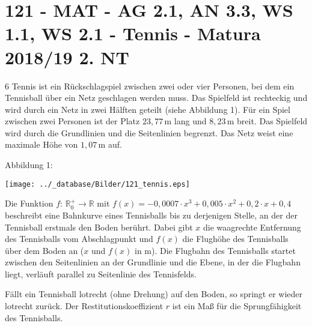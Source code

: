 \section{121 - MAT - AG 2.1, AN 3.3, WS 1.1, WS 2.1 - Tennis - Matura 2018/19 2. NT}

\begin{langesbeispiel} \item[6] %
Tennis ist ein Rückschlagspiel zwischen zwei oder vier Personen, bei dem ein Tennisball über
ein Netz geschlagen werden muss. Das Spielfeld ist rechteckig und wird durch ein Netz in zwei
Hälften geteilt (siehe Abbildung 1). Für ein Spiel zwischen zwei Personen ist der Platz $23,77$\,m
lang und $8,23$\,m breit. Das Spielfeld wird durch die Grundlinien und die Seitenlinien begrenzt. Das
Netz weist eine maximale Höhe von $1,07$\,m auf.

Abbildung 1:

\begin{center}
\texttt{[image: ../\_database/Bilder/121\_tennis.eps]}
\end{center}%

\begin{aufgabenstellung}
\item Die Funktion $f$: $\mathbb{R}^+_0\rightarrow\mathbb{R}$ mit $f(x)=-0,0007\cdot x^3+0,005\cdot x^2+0,2\cdot x+0,4$ beschreibt eine Bahnkurve eines Tennisballs bis zu derjenigen Stelle, an der der Tennisball erstmals den Boden berührt. Dabei gibt $x$ die waagrechte Entfernung des Tennisballs vom Abschlagpunkt und $f(x)$ die Flughöhe des Tennisballs über dem Boden an ($x$ und $f(x)$ in m). Die Flugbahn des Tennisballs startet zwischen den Seitenlinien an der Grundlinie und die Ebene, in der die Flugbahn liegt, verläuft parallel zu Seitenlinie des Tennisfelds.%


\item Fällt ein Tennisball lotrecht (ohne Drehung) auf den Boden, so springt er wieder lotrecht zurück. Der Restitutionskoeffizient $r$ ist ein Maß für die Sprungfähigkeit des Tennisballs.
	

\end{aufgabenstellung}
\end{langesbeispiel}
